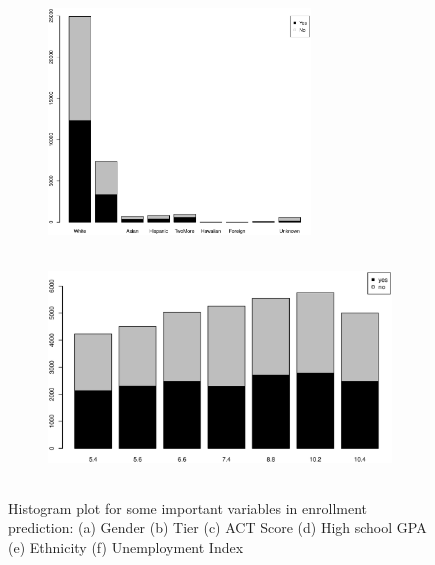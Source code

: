 \documentclass[12pt,english]{report}
\begin{document}
\begin{figure}[p]
\medskip
\begin{subfigure}{0.45\textwidth}
\includegraphics[width=\linewidth, height=6cm]{pic/enroll_ethnicity}
\caption{} \label{enroll:e}
\end{subfigure}\hspace*{\fill}
\begin{subfigure}{0.45\textwidth}
\includegraphics[width=\linewidth, height=6cm]{pic/enroll_index}
\caption{} \label{enroll:f}
\end{subfigure}
  \caption{Histogram plot for some important variables in enrollment prediction: 
                        (a) Gender (b) Tier (c) ACT Score (d) High school GPA (e) Ethnicity (f) Unemployment Index}
  \label{enroll_sum} 
\end{figure}
\end{document}
